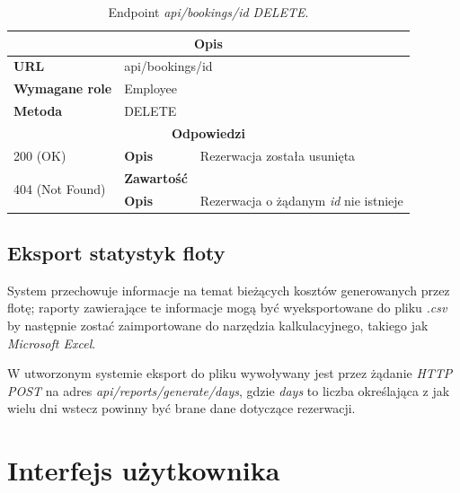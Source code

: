 \documentclass[eng,printmode,openany]{mgr}
\begin{document}
\begin{table}[H]
	\caption{Endpoint \textit{api/bookings/id DELETE}.}
	\begin{tabularx}{\textwidth}{|l|l|X|}
		\hline
		\multicolumn{3}{|c|}{\textbf{\textbf{Opis}}}
		\\ \hline
		\textbf{URL}                       & \multicolumn{2}{l|}{api/bookings/id}
		\\ \hline
		\textbf{Wymagane role}             & \multicolumn{2}{l|}{Employee}
		\\ \hline
		\textbf{Metoda}                    & \multicolumn{2}{l|}{DELETE}
		\\ \hline
		\multicolumn{3}{|c|}{\textbf{Odpowiedzi}}
		\\ \hline
		200 (OK)			                & \textbf{Opis}         	& Rezerwacja została usunięta
		\\ \hline
		\multirow{2}{*}{404 (Not Found)} 	& \textbf{Zawartość}     & 
		\\ \cline{2-3}                      & \textbf{Opis}          & Rezerwacja o żądanym \textit{id} nie istnieje
		\\ \hline
	\end{tabularx}
\end{table}

	
	\newpage
	\subsection{Eksport statystyk floty}
	System przechowuje informacje na temat bieżących kosztów generowanych przez flotę; raporty zawierające te informacje mogą być wyeksportowane do pliku \textit{.csv} by następnie zostać zaimportowane do narzędzia kalkulacyjnego, takiego jak \textit{Microsoft Excel}.
	
	W utworzonym systemie eksport do pliku wywoływany jest przez żądanie \textit{HTTP POST} na adres \textit{api/reports/generate/days}, gdzie \textit{days} to liczba określająca z jak wielu dni wstecz powinny być brane dane dotyczące rezerwacji.
	
	
	\newpage
	
	
	
	\section{Interfejs użytkownika}
\end{document}
